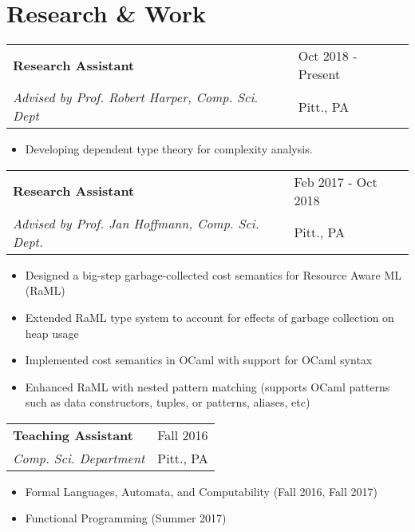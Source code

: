 \documentclass[12pt]{article}
\begin{document}
\section{Research \& Work}
\begin{tabu}{@{}l   X[r] }
  \textbf{Research Assistant} & Oct 2018 - Present\\
\emph{Advised by Prof. Robert Harper, Comp. Sci. Dept} & Pitt., PA
\end{tabu}
\vspace{-5pt}

\begin{itemize}
\itemsep-2pt
\item Developing dependent type theory for complexity analysis.
\end{itemize}

\begin{tabu}{@{}l X[r]  }
  \bfseries{Research Assistant} &  Feb 2017 - Oct 2018\\
\emph{Advised by Prof. Jan Hoffmann, Comp. Sci. Dept.} &Pitt., PA 
\end{tabu}
\vspace{-5pt}

\begin{itemize}
\itemsep-2pt
\item Designed a big-step garbage-collected cost semantics for Resource Aware ML (RaML)
\item Extended RaML type system to account for effects of garbage collection on heap usage
\item Implemented cost semantics in OCaml with support for OCaml syntax
\item Enhanced RaML with nested pattern matching (supports OCaml patterns such as data constructors, tuples, or patterns, aliases, etc)
\end{itemize}

\newpage
\begin{tabu}{@{}l  X[r]}
  \bfseries{Teaching Assistant} & Fall 2016\\
\emph{Comp. Sci. Department} & Pitt., PA
\end{tabu}
\vspace{-5pt}

\begin{itemize}
\itemsep-2pt
\item Formal Languages, Automata, and Computability (Fall 2016, Fall 2017)
\item Functional Programming (Summer 2017)
\end{itemize}
\end{document}
